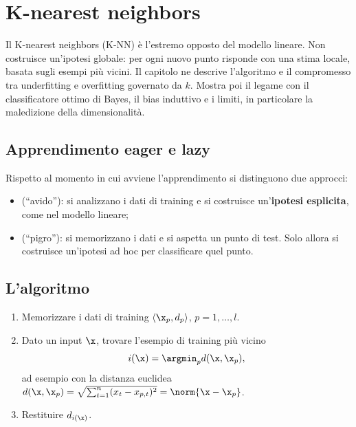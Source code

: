 \chapter{K-nearest neighbors}
\label{cap:knn}

\begin{inbreve}
Il K-nearest neighbors (K-NN) è l'estremo opposto del modello lineare. Non costruisce un'ipotesi globale: per
ogni nuovo punto risponde con una stima locale, basata sugli esempi più vicini. Il capitolo ne descrive
l'algoritmo e il compromesso tra underfitting e overfitting governato da $k$. Mostra poi il legame con il
classificatore ottimo di Bayes, il bias induttivo e i limiti, in particolare la maledizione della dimensionalità.
\end{inbreve}

\section{Apprendimento eager e lazy}

Rispetto al momento in cui avviene l'apprendimento si distinguono due approcci:
\begin{itemize}
  \item {} (``avido''): si analizzano i dati di training e si costruisce un'\textbf{ipotesi
        esplicita}, come nel modello lineare;
  \item {} (``pigro''): si memorizzano i dati e si aspetta un punto di test. Solo allora si costruisce
        un'ipotesi ad hoc per classificare quel punto.
\end{itemize}

\section{L'algoritmo}
\label{sec:knn-algoritmo}

\begin{algoritmo}
\begin{enumerate}
  \item Memorizzare i dati di training $\langle\x_p,d_p\rangle$, $p=1,\dots,l$.
  \item Dato un input $\x$, trovare l'esempio di training più vicino
        \[
        i(\x) = \argmin_p d(\x,\x_p),
        \]
        ad esempio con la distanza euclidea $d(\x,\x_p) = \sqrt{\sum_{t=1}^n(x_t-x_{p,t})^2} = \norm{\x-\x_p}$.
  \item Restituire $d_{i(\x)}$.
\end{enumerate}
\end{algoritmo}

